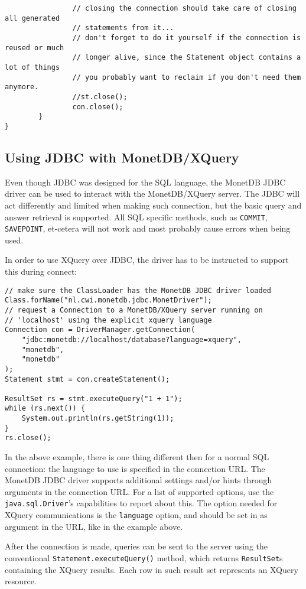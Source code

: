 \documentclass{article}
\begin{document}
\begin{verbatim}
                // closing the connection should take care of closing all generated
                // statements from it...
                // don't forget to do it yourself if the connection is reused or much
                // longer alive, since the Statement object contains a lot of things
                // you probably want to reclaim if you don't need them anymore.
                //st.close();
                con.close();
        }
}
\end{verbatim}

\subsection{Using JDBC with MonetDB/XQuery}
Even though JDBC was designed for the SQL language, the MonetDB JDBC
driver can be used to interact with the MonetDB/XQuery server.  The JDBC
will act differently and limited when making such connection, but the
basic query and answer retrieval is supported.  All SQL specific
methods, such as \texttt{COMMIT}, \texttt{SAVEPOINT}, et-cetera will not
work and most probably cause errors when being used.

In order to use XQuery over JDBC, the driver has to be instructed to
support this during connect:
\begin{verbatim}
// make sure the ClassLoader has the MonetDB JDBC driver loaded
Class.forName("nl.cwi.monetdb.jdbc.MonetDriver");
// request a Connection to a MonetDB/XQuery server running on
// 'localhost' using the explicit xquery language
Connection con = DriverManager.getConnection(
    "jdbc:monetdb://localhost/database?language=xquery",
    "monetdb",
    "monetdb"
);
Statement stmt = con.createStatement();

ResultSet rs = stmt.executeQuery("1 + 1");
while (rs.next()) {
    System.out.println(rs.getString(1));
}
rs.close();
\end{verbatim}
In the above example, there is one thing different then for a normal SQL
connection: the language to use is specified in the connection URL.
The MonetDB JDBC driver supports
additional settings and/or hints through arguments in the connection
URL.  For a list of supported options, use the
\texttt{java.sql.Driver}'s capabilities to report about this.  The
option needed for XQuery communications is the \texttt{language} option,
and should be set in as argument in the URL, like in the example above.

After the connection is made, queries can be sent to the server using
the conventional \texttt{Statement.executeQuery()} method, which returns
\texttt{ResultSet}s containing the XQuery results.  Each row in such
result set represents an XQuery resource.
\end{document}
